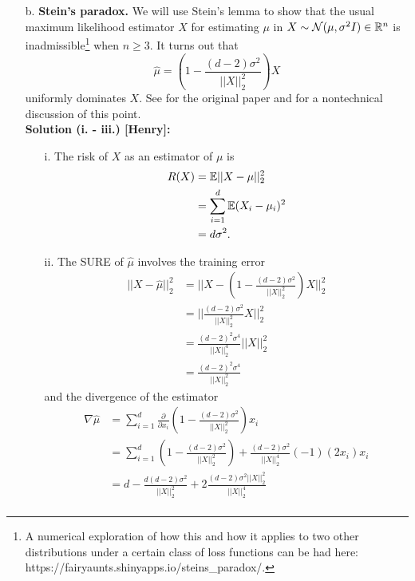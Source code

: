 \documentclass[11pt]{article}
\begin{document}
\begin{enumerate}
\begin{itemize}
  \item[b.] \textbf{Stein's paradox.}  We will use Stein's lemma to show that
    the usual maximum likelihood estimator $X$ for estimating $\mu$ in $X
    \sim \mathcal{N}(\mu,\sigma^2I) \in \mathbb{R}^n$ is inadmissible\footnote{A numerical
      exploration of how this and how it applies to two other distributions
      under a certain class of loss functions can be had here:
      https://fairyaunts.shinyapps.io/steins\_paradox/.}  when $n \geq 3$.  It
    turns out that
    \[
    \hat\mu = \left(1 - \frac{(d - 2)\sigma^2}{||X||_2^2}\right) X
    \]
    uniformly dominates $X$.  See \cite{Stein1956Inadmissibility} for the
    original paper and \cite{efron1977stein} for a nontechnical discussion of
    this point.\\
    \textbf{Solution (i. - iii.) [Henry]:}
    \begin{itemize}
    \item[i.] The risk of $X$ as an estimator of $\mu$ is
      \begin{align*}
        R(X) & = \mathbb{E}||X - \mu||^2_2\\
             & = \sum_{i = 1}^d \mathbb{E}(X_i - \mu_i)^2\\
             & = d\sigma^2.
      \end{align*}
    \item[ii.] The SURE of $\hat\mu$ involves the training error
      \begin{align*}
        ||X - \hat{\mu}||^2_2 & = ||X -
        \left(1 - \frac{(d - 2)\sigma^2}{||X||_2^2}\right) X||^2_2 \\
        & = ||\frac{(d - 2)\sigma^2}{||X||_2^2} X||^2_2 \\
        & = \frac{(d - 2)^2\sigma^4}{||X||^4_2}||X||_2^2\\
        & = \frac{(d - 2)^2\sigma^4}{||X||_2^2}
      \end{align*}
      and the divergence of the estimator
      \begin{align*}
        \nabla\hat{\mu} & = \sum_{i = 1}^d \frac{\partial}{\partial x_i}
        \left(1 - \frac{(d - 2)\sigma^2}{||X||_2^2}\right) x_i \\
        & = \sum_{i = 1}^d \left(1 - \frac{(d - 2)\sigma^2}{||X||_2^2}\right)
        + \frac{(d - 2)\sigma^2}{||X||^4_2}(-1)(2x_i)x_i\\
        & = d - \frac{d(d - 2)\sigma^2}{||X||^2_2}
        + 2\frac{(d - 2)\sigma^2||X||_2^2}{||X||_2^4} \\

\end{align*}
\end{itemize}
\end{itemize}
\end{enumerate}
\end{document}
